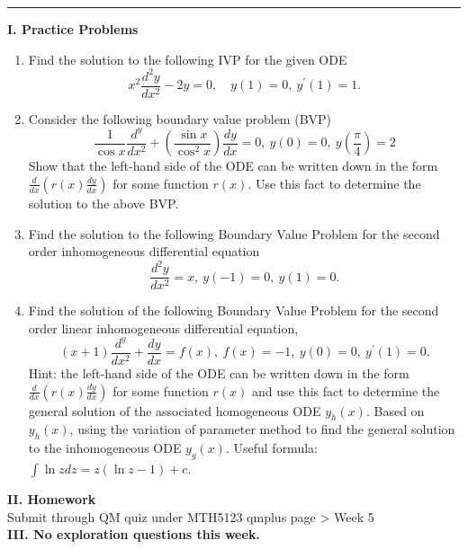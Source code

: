 \documentclass[11pt,a4paper,twoside]{article}
\begin{document}
	\rule{\textwidth}{0.4pt}
	\newpage
	\textbf{I. Practice Problems}\par
	\begin{enumerate}[\bfseries A.]
		\item Find the solution to the following IVP for the given ODE
		$$
		x^2\frac{d^2y}{dx^2} - 2y = 0,\quad y(1) = 0,\ y^\prime(1) = 1.
		$$
		\item Consider the following boundary value problem (BVP)
		$$
		\frac{1}{\cos x}\frac{d^y}{dx^2} + \left(\frac{\sin x}{\cos^2x}\right)\frac{dy}{dx} = 0,\ y(0) = 0,\ y(\frac{\pi}{4}) = 2
		$$
		Show that the left-hand side of the ODE can be written down in the form $\frac{d}{dx}(r(x)\frac{dy}{dx})$ for some function $r(x)$. Use this fact to determine the solution to the above BVP.
		\item Find the solution to the following Boundary Value Problem for the second order inhomogeneous differential equation
		$$
		\frac{d^2y}{dx^2} = x,\ y(-1) = 0,\ y(1) = 0.
		$$
		\item Find the solution of the following Boundary Value Problem for the second order linear inhomogeneous differential equation,
		$$
		(x+1)\frac{d^y}{dx^2} + \frac{dy}{dx} = f(x),\ f(x) = -1,\ y(0) = 0,\ y^\prime(1) = 0.
		$$
		Hint: the left-hand side of the ODE can be written down in the form $\frac{d}{dx}(r(x)\frac{dy}{dx})$ for some function $r(x)$ and use this fact to determine the general solution of the associated homogeneous ODE $y_h(x)$. Based on $y_h(x)$, using the variation of parameter method to find the general solution to the inhomogeneous ODE $y_g(x)$. Useful formula: $\int \ln zdz = z(\ln z -1)+c$.
	\end{enumerate}
	\textbf{II. Homework}\\
	Submit through QM quiz under MTH5123 qmplus page > Week 5\\
	\textbf{III. No exploration questions this week.}
\end{document}
